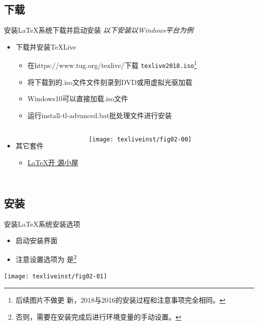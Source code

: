 \documentclass[xcolor=svgnames, t]{ctexbeamer}
\begin{document}
\subsection[下载]{下载}
\begin{frame}[t]{安装\LaTeX 系统}{下载并启动安装}
  \stretchon
  \emph{以下安装以Windows平台为例}
  \begin{itemize}
  \item 下载并安装\TeX Live
    \begin{itemize}
    \item 在\url{}{https://www.tug.org/texlive/}下载
      \texttt{texlive2018.iso}\footnote[frame]{后续图片不做更
        新，2018与2016的安装过程和注意事项完全相同。}
    \item 将下载到的.iso文件文件刻录到DVD或用虚拟光驱加载
    \item Windows10可以\alert{直接加载}.iso文件
    \item 运行install-tl-advanced.bat批处理文件进行安装
    \end{itemize}
  \end{itemize}
  \vspace{-3ex}
  \begin{columns}[T]
  \begin{itemize}  
  \item 其它套件
    \begin{itemize}
    \item \href{http://www.latexstudio.net/page/texsoftware}{\LaTeX 开
        源小屋}
    \end{itemize}
  \end{itemize}
  \centering%
  \texttt{[image: texliveinst/fig02-00]}
  \end{columns}
  \stretchoff
\end{frame}
\subsection[安装]{安装}
\begin{frame}[t]{安装\LaTeX 系统}{安装选项}
  \begin{itemize}
  \item 启动安装界面
  \item 注意设置选项为
    \alert{是}\footnote[frame]{否则，需要在安装完成后进行环境变量的手动设置。}
  \end{itemize}
  \centering
  \texttt{[image: texliveinst/fig02-01]}
\end{frame}
\end{document}
